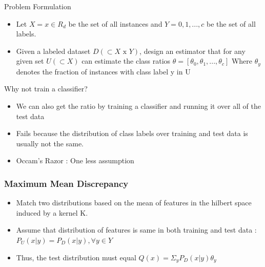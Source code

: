 \begin{frame}{Problem Formulation}
 \begin{itemize}
  \item  Let $X = {x \in R_d }$ be the set of all instances and 
  $Y = {0, 1, . . . , c}$ be the  set of all labels.
 \medskip
\item Given a labeled dataset $D(\subset X\text{ x } Y)$, design an estimator that for any given set
$U (\subset X )$ can estimate the class ratios $\theta = [\theta_0 , \theta_1 , . . . , \theta_c ]$
Where  $\theta_y$ denotes the fraction of instances with class label y in U 
 \end{itemize}

\end{frame}
\begin{frame}{Why not train a classifier?}
 \begin{itemize}
  \item We can also get the ratio by training a classifier and running it over all of the test data
  \medskip
  \item Fails because the distribution of class labels over training and test data is usually not the same.
\medskip
  \item Occam's Razor : One less assumption
 \end{itemize}

\end{frame}
\begin{frame}
 \frametitle{Maximum Mean Discrepancy}
 \begin{itemize}
  \item Match two distributions based on the mean of features in the hilbert space induced by a kernel K. \medskip
  \item Assume that distribution of features is same in both training and test data : 
    $P_U (x|y) = P_D (x|y), \forall y \in Y$ \medskip
  \item Thus, the test distribution must equal $Q(x) = \Sigma_{y} P_D (x|y)\theta_y$  \medskip
 \end{itemize}

\end{frame}

